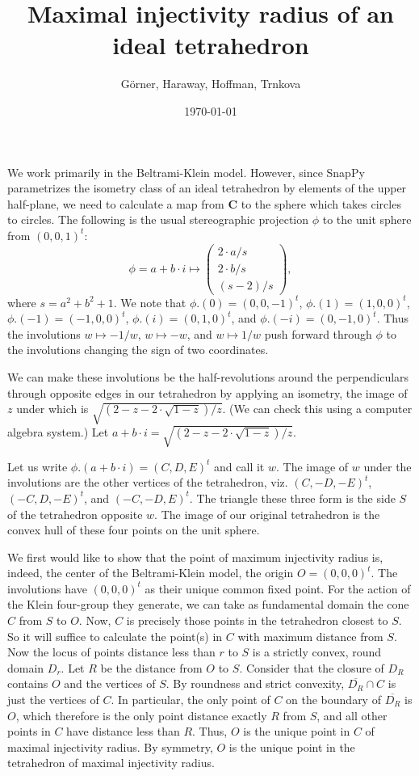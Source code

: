 \documentclass{amsart}
\theoremstyle{plain}
\begin{document}
\title{Maximal injectivity radius of an ideal tetrahedron}
\author{G\"{o}rner, Haraway, Hoffman, Trnkova}
\date{\today}
\maketitle


We work primarily in the Beltrami-Klein model. However,
since SnapPy parametrizes the isometry class of an
ideal tetrahedron by elements of the upper half-plane,
we need to calculate a map from $\mathbf{C}$ to
the sphere which takes circles to circles. The following
is the usual stereographic projection $\phi$ to the unit sphere
from $(0,0,1)^t$:
\[
\phi = a+b\cdot i \mapsto
\begin{pmatrix}
2\cdot a / s\\
2\cdot b / s\\
(s-2)/s
\end{pmatrix},
\]
where $s = a^2 + b^2 + 1$.
We note that $\phi.(0) = (0,0,-1)^t$,
$\phi.(1) = (1,0,0)^t$, $\phi.(-1) = (-1,0,0)^t$,
$\phi.(i) = (0,1,0)^t$, and $\phi.(-i) = (0,-1,0)^t$.
Thus the involutions $w\mapsto -1/w$, $w\mapsto -w$, 
and $w \mapsto 1/w$ push forward through $\phi$
to the involutions changing the sign of two coordinates.

We can make these involutions be the half-revolutions
around the perpendiculars through opposite edges in our
tetrahedron by applying an isometry, the image
of $z$ under which is $\sqrt{(2-z-2\cdot\sqrt{1-z})/z}$.
(We can check this using a computer algebra system.)
Let $a+b\cdot i = \sqrt{(2-z-2\cdot\sqrt{1-z})/z}$.

Let us write $\phi.(a+b\cdot i) = (C,D,E)^t$ and
call it $w$. The image of $w$ under the involutions
are the other vertices of the tetrahedron, viz.
$(C,-D,-E)^t$, $(-C,D,-E)^t$, and $(-C,-D,E)^t$.
The triangle these three form is the 
side $S$ of the tetrahedron opposite $w$.
The image of our original tetrahedron is the convex
hull of these four points on the unit sphere.

We first would like to show that the point of
maximum injectivity radius is, indeed, the center
of the Beltrami-Klein model, the origin $O = (0,0,0)^t$.
The involutions have $(0,0,0)^t$ as their unique
common fixed point. For the action of the Klein four-group
they generate, we can take as fundamental domain the
cone $C$ from $S$ to $O$. Now, $C$ is precisely those
points in the tetrahedron closest to $S$. So it will
suffice to calculate the point(s) in $C$ with maximum
distance from $S$. Now the locus of points distance less than
$r$ to $S$ is a strictly convex, round domain $D_r$.
Let $R$ be the distance from $O$ to $S$. Consider
that the closure of $D_R$ contains $O$ and the vertices
of $S$. By roundness and strict convexity, $\overline{D_R} \cap C$
is just the vertices of $C$. In particular, the only point
of $C$ on the boundary of $\overline{D_R}$ is $O$, which
therefore is the only point distance exactly $R$ from $S$,
and all other points in $C$ have distance less than $R$.
Thus, $O$ is the unique point in $C$ of maximal injectivity
radius. By symmetry, $O$ is the unique point in the
tetrahedron of maximal injectivity radius.
\end{document}
